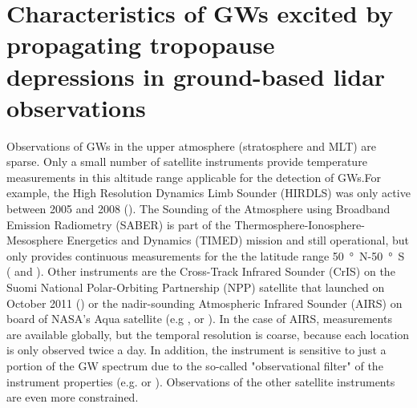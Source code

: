 \chapter{Characteristics of GWs excited by propagating tropopause depressions in ground-based lidar observations}
\label{cha:lidar}

Observations of GWs in the upper atmosphere (stratosphere and MLT) are sparse. Only a small number of satellite instruments provide temperature measurements in this altitude range applicable for the detection of GWs.For example, the High Resolution Dynamics Limb Sounder (HIRDLS) was only active between 2005 and 2008 (\cite[]{gille_high_2008}). The Sounding of the Atmosphere using Broadband Emission Radiometry (SABER) is part of the Thermosphere-Ionosphere-Mesosphere Energetics and Dynamics (TIMED) mission and still operational, but only provides continuous measurements for the the latitude range \SI{50}{\degree N}-\SI{50}{\degree S} (\cite[]{mlynczak_energetics_1997} and \cite[]{ern_gracile_2018}). Other instruments are the Cross-Track Infrared Sounder (CrIS) on the Suomi National Polar-Orbiting Partnership (NPP) satellite that launched on October 2011 (\cite[]{goldberg_joint_2013}) or the nadir-sounding Atmospheric Infrared Sounder (AIRS) on board of NASA's Aqua satellite (e.g \cite[]{eckermann_stratospheric_2019}, \cite[]{hindley_gravity_2019} or \cite*[]{hindley_18year_2020}). In the case of AIRS, measurements are available globally, but the temporal resolution is coarse, because each location is only observed twice a day. In addition, the instrument is sensitive to just a portion of the GW spectrum due to the so-called "observational filter" of the instrument properties (e.g. \cite[]{preusse_space-based_2002} or \cite[]{alexander_recent_2010}). Observations of the other satellite instruments are even more constrained. 

